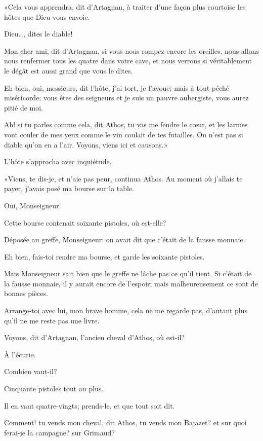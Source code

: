«Cela vous apprendra, dit d'Artagnan, à traiter d'une façon plus courtoise les hôtes que Dieu vous envoie. 

\speak  Dieu\dots, dites le diable! 

\speak  Mon cher ami, dit d'Artagnan, si vous nous rompez encore les oreilles, nous allons nous renfermer tous les quatre dans votre cave, et nous verrons si véritablement le dégât est aussi grand que vous le dites. 

\speak  Eh bien, oui, messieurs, dit l'hôte, j'ai tort, je l'avoue; mais à tout péché miséricorde; vous êtes des seigneurs et je suis un pauvre aubergiste, vous aurez pitié de moi. 

\speak  Ah! si tu parles comme cela, dit Athos, tu vas me fendre le cœur, et les larmes vont couler de mes yeux comme le vin coulait de tes futailles. On n'est pas si diable qu'on en a l'air. Voyons, viens ici et causons.» 

L'hôte s'approcha avec inquiétude. 

«Viens, te dis-je, et n'aie pas peur, continua Athos. Au moment où j'allais te payer, j'avais posé ma bourse sur la table. 

\speak  Oui, Monseigneur. 

\speak  Cette bourse contenait soixante pistoles, où est-elle? 

\speak  Déposée au greffe, Monseigneur: on avait dit que c'était de la fausse monnaie. 

\speak  Eh bien, fais-toi rendre ma bourse, et garde les soixante pistoles. 

\speak  Mais Monseigneur sait bien que le greffe ne lâche pas ce qu'il tient. Si c'était de la fausse monnaie, il y aurait encore de l'espoir; mais malheureusement ce sont de bonnes pièces. 

\speak  Arrange-toi avec lui, mon brave homme, cela ne me regarde pas, d'autant plus qu'il ne me reste pas une livre. 

\speak  Voyons, dit d'Artagnan, l'ancien cheval d'Athos, où est-il? 

\speak  À l'écurie. 

\speak  Combien vaut-il? 

\speak  Cinquante pistoles tout au plus. 

\speak  Il en vaut quatre-vingts; prends-le, et que tout soit dit. 

\speak  Comment! tu vends mon cheval, dit Athos, tu vends mon Bajazet? et sur quoi ferai-je la campagne? sur Grimaud? 

